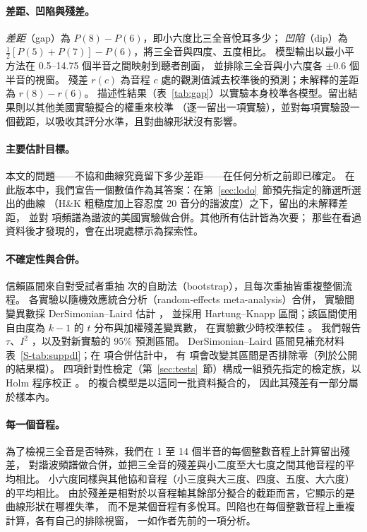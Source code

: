 \documentclass[11pt,a4paper]{article}
\newcommand{\HK}{H\&K}
\begin{document}
\paragraph{差距、凹陷與殘差。}
\emph{差距}（gap）為 $P(8)-P(6)$，即小六度比三全音悅耳多少；
\emph{凹陷}（dip）為 $\tfrac12[P(5)+P(7)]-P(6)$，將三全音與四度、五度相比。
模型輸出以最小平方法在 0.5--14.75 個半音之間映射到聽者剖面，
並排除三全音與小六度各 $\pm0.6$ 個半音的視窗。
殘差 $r(c)$ 為音程 $c$ 處的觀測值減去校準後的預測；未解釋的差距為 $r(8)-r(6)$。
描述性結果（表~\ref{tab:gap}）以實驗本身校準各模型。留出結果則以其他美國實驗擬合的權重來校準
（逐一留出一項實驗），並對每項實驗設一個截距，以吸收其評分水準，且對曲線形狀沒有影響。

\paragraph{主要估計目標。}
本文的問題——不協和曲線究竟留下多少差距——在任何分析之前即已確定。
在此版本中，我們宣告一個數值作為其答案：在第~\ref{sec:lodo}~節預先指定的篩選所選出的曲線
（\HK{} 粗糙度加上容忍度 20 音分的諧波度）之下，留出的未解釋差距，
並對 \primK{} 項頻譜為諧波的美國實驗做合併。其他所有估計皆為次要；
那些在看過資料後才發現的，會在出現處標示為探索性。

\paragraph{不確定性與合併。}
信賴區間來自對受試者重抽 \nboot{} 次的自助法（bootstrap），且每次重抽皆重複整個流程。
各實驗以隨機效應統合分析（random-effects meta-analysis）合併，
實驗間變異數採 DerSimonian--Laird 估計 \citep{dersimonian1986}，
並採用 Hartung--Knapp 區間；該區間使用自由度為 $k-1$ 的 $t$ 分布與加權殘差變異數，
在實驗數少時校準較佳 \citep{hartung2001,inthout2014}。
我們報告 $\tau$、$I^2$ \citep{higgins2002}，以及對新實驗的 95\% 預測區間。
DerSimonian--Laird 區間見補充材料表~\ref{S-tab:suppdl}；在 \reNest{} 項合併估計中，
有 \reNflip{} 項會改變其區間是否排除零（列於公開的結果檔）。
四項針對性檢定（第~\ref{sec:tests}~節）構成一組預先指定的檢定族，以 Holm 程序校正
\citep{holm1979}。\citet{marjieh2024} 的複合模型是以這同一批資料擬合的，
因此其殘差有一部分屬於樣本內。

\paragraph{每一個音程。}
為了檢視三全音是否特殊，我們在 1 至 14 個半音的每個整數音程上計算留出殘差，
對諧波頻譜做合併，並把三全音的殘差與小二度至大七度之間其他音程的平均相比。
小六度同樣與其他協和音程（小三度與大三度、四度、五度、大六度）的平均相比。
由於殘差是相對於以音程軸其餘部分擬合的截距而言，它顯示的是曲線形狀在哪裡失準，
而不是某個音程有多悅耳。凹陷也在每個整數音程上重複計算，各有自己的排除視窗，
一如作者先前的一項分析。
\end{document}
